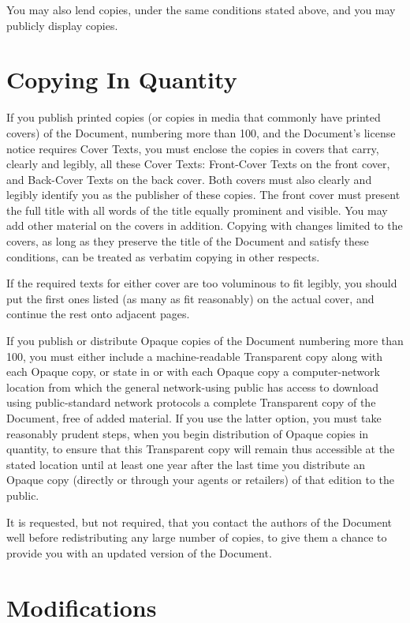 You may also lend copies, under the same conditions stated above, and
you may publicly display copies.

\section{Copying In Quantity}
\label{sec:License-GFDL-3}

If you publish printed copies (or copies in media that commonly have
printed covers) of the Document, numbering more than 100, and the
Document's license notice requires Cover Texts, you must enclose the
copies in covers that carry, clearly and legibly, all these Cover
Texts: Front-Cover Texts on the front cover, and Back-Cover Texts on
the back cover.  Both covers must also clearly and legibly identify
you as the publisher of these copies.  The front cover must present
the full title with all words of the title equally prominent and
visible.  You may add other material on the covers in addition.
Copying with changes limited to the covers, as long as they preserve
the title of the Document and satisfy these conditions, can be treated
as verbatim copying in other respects.

If the required texts for either cover are too voluminous to fit
legibly, you should put the first ones listed (as many as fit
reasonably) on the actual cover, and continue the rest onto adjacent
pages.

If you publish or distribute Opaque copies of the Document numbering
more than 100, you must either include a machine-readable Transparent
copy along with each Opaque copy, or state in or with each Opaque copy
a computer-network location from which the general network-using
public has access to download using public-standard network protocols
a complete Transparent copy of the Document, free of added material.
If you use the latter option, you must take reasonably prudent steps,
when you begin distribution of Opaque copies in quantity, to ensure
that this Transparent copy will remain thus accessible at the stated
location until at least one year after the last time you distribute an
Opaque copy (directly or through your agents or retailers) of that
edition to the public.

It is requested, but not required, that you contact the authors of the
Document well before redistributing any large number of copies, to
give them a chance to provide you with an updated version of the
Document.

\section{Modifications}
\label{sec:License-GFDL-4}


